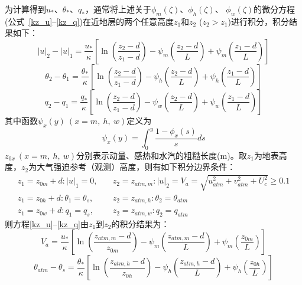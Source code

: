 为计算得到$u_\ast$、$\theta_\ast$、$q_\ast$，通常将上述关于$\phi_m\left(\zeta\right)$、$\phi_h\left(\zeta\right)$、
$\phi_w(\zeta)$的微分方程(公式~\eqref{kz_u}--\eqref{kz_q})在近地层的两个任意高度$z_1$和$z_2$ ($z_2>z_1$)进行积分，积分结果如下：
\begin{equation}
|u|_{2}-|u|_{1}=\frac{u_{*}}{\kappa}\left[\ln \left(\frac{z_{2}-d}{z_{1}-d}\right)-\psi_{m}\left(\frac{z_{2}-d}{L}\right)+\psi_{m}\left(\frac{z_{1}-d}{L}\right)\right]
\end{equation}
%
\begin{equation}
\theta_{2}-\theta_{1}=\frac{\theta_{*}}{\kappa}\left[\ln \left(\frac{z_{2}-d}{z_{1}-d}\right)-\psi_{h}\left(\frac{z_{2}-d}{L}\right)+\psi_{h}\left(\frac{z_{1}-d}{L}\right)\right]
\end{equation}
%
\begin{equation}
q_{2}-q_{1}=\frac{q_{*}}{\kappa}\left[\ln \left(\frac{z_{2}-d}{z_{1}-d}\right)-\psi_{w}\left(\frac{z_{2}-d}{L}\right)+\psi_{w}\left(\frac{z_{1}-d}{L}\right)\right]
\end{equation}
其中函数$\psi_x\left(y\right)\ (x=m,\ h,\ w)$定义为
\begin{equation}
\psi_{x}(y)=\int_{0}^{y} \frac{1-\phi_{x}(s)}{s} d s
\end{equation}
$z_{0x}\ (x=m,\ h,\ w)$分别表示动量、感热和水汽的粗糙长度(m)。取$z_1$为地表高度，$z_2$为大气强迫参考（观测）高度，则有如下积分边界条件：
\begin{equation}\label{VaIni}
\begin{array}{ll}z_{1}=z_{0 m}+d:|u|_{1}=0, \quad & z_{2}=z_{atm, m}: |u|_{2}=V_{a}=\sqrt{u_{atm}^{2}+v_{atm}^{2}+U_{c}^{2}} \geqslant 0.1 \\ 
     z_{1}=z_{0 h}+d: \theta_{1}=\theta_{s}, & z_{2}=z_{atm, h}: \theta_{2}=\theta_{atm} \\ 
     z_{1}=z_{0 w}+d: q_{1}=q_{s}, & z_{2}=z_{atm, w}: q_{2}=q_{atm}\end{array}
\end{equation}
则方程\eqref{kz_u}--\eqref{kz_q}由$z_1$到$z_2$的积分结果为：
\begin{equation}\label{Va}
V_{a}=\frac{u_{*}}{\kappa}\left[\ln \left(\frac{z_{atm, m}-d}{z_{0 m}}\right)-\psi_{m}\left(\frac{z_{atm, m}-d}{L}\right)+\psi_{m}\left(\frac{z_{0 m}}{L}\right)\right]
\end{equation}
%
\begin{equation}\label{theta_atm-theta_s}
\theta_{atm}-\theta_{s}=\frac{\theta_{*}}{\kappa}\left[\ln \left(\frac{z_{atm, h}-d}{z_{0 h}}\right)-\psi_{h}\left(\frac{z_{atm, h}-d}{L}\right)+\psi_{h}\left(\frac{z_{0 h}}{L}\right)\right]
\end{equation}

